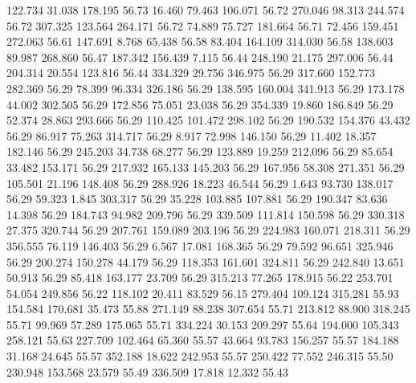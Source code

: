  122.734   31.038  178.195        56.73
  16.460   79.463  106.071        56.72
 270.046   98.313  244.574        56.72
 307.325  123.564  264.171        56.72
  74.889   75.727  181.664        56.71
  72.456  159.451  272.063        56.61
 147.691    8.768   65.438        56.58
  83.404  164.109  314.030        56.58
 138.603   89.987  268.860        56.47
 187.342  156.439    7.115        56.44
 248.190   21.175  297.006        56.44
 204.314   20.554  123.816        56.44
 334.329   29.756  346.975        56.29
 317.660  152.773  282.369        56.29
  78.399   96.334  326.186        56.29
 138.595  160.004  341.913        56.29
 173.178   44.002  302.505        56.29
 172.856   75.051   23.038        56.29
 354.339   19.860  186.849        56.29
  52.374   28.863  293.666        56.29
 110.425  101.472  298.102        56.29
 190.532  154.376   43.432        56.29
  86.917   75.263  314.717        56.29
   8.917   72.998  146.150        56.29
  11.402   18.357  182.146        56.29
 245.203   34.738   68.277        56.29
 123.889   19.259  212.096        56.29
  85.654   33.482  153.171        56.29
 217.932  165.133  145.203        56.29
 167.956   58.308  271.351        56.29
 105.501   21.196  148.408        56.29
 288.926   18.223   46.544        56.29
   1.643   93.730  138.017        56.29
  59.323    1.845  303.317        56.29
  35.228  103.885  107.881        56.29
 190.347   83.636   14.398        56.29
 184.743   94.982  209.796        56.29
 339.509  111.814  150.598        56.29
 330.318   27.375  320.744        56.29
 207.761  159.089  203.196        56.29
 224.983  160.071  218.311        56.29
 356.555   76.119  146.403        56.29
   6.567   17.081  168.365        56.29
  79.592   96.651  325.946        56.29
 200.274  150.278   44.179        56.29
 118.353  161.601  324.811        56.29
 242.840   13.651   50.913        56.29
  85.418  163.177   23.709        56.29
 315.213   77.265  178.915        56.22
 253.701   54.054  249.856        56.22
 118.102   20.411   83.529        56.15
 279.404  109.124  315.281        55.93
 154.584  170.681   35.473        55.88
 271.149   88.238  307.654        55.71
 213.812   88.900  318.245        55.71
  99.969   57.289  175.065        55.71
 334.224   30.153  209.297        55.64
 194.000  105.343  258.121        55.63
 227.709  102.464   65.360        55.57
  43.664   93.783  156.257        55.57
 184.188   31.168   24.645        55.57
 352.188   18.622  242.953        55.57
 250.422   77.552  246.315        55.50
 230.948  153.568   23.579        55.49
 336.509   17.818   12.332        55.43
